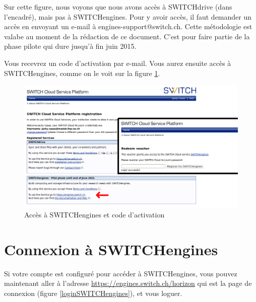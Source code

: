Sur cette figure, nous voyons que nous avons accès à SWITCHdrive (dans l'encadré), mais pas à SWITCHengines. Pour y avoir accès, il faut demander un accès en envoyant un e-mail à engines-support@switch.ch. Cette métodologie est valabe au moment de la rédaction de ce document. C'est pour faire partie de la phase pilote qui dure jusqu'à fin juin 2015.


Vous recevrez un code d'activation par e-mail. Vous aurez ensuite accès à SWITCHengines, comme on le voit sur la figure \ref{enginesRecap2}.

\begin{figure}[h]
  \centering
    \includegraphics[width=\linewidth]{img/switch6.png}
  \caption{Accès à SWITCHengines et code d'activation}
  \label{enginesRecap2}
\end{figure}

\clearpage


\section{Connexion à SWITCHengines}


Si votre compte est configuré pour accéder à SWITCHengines, vous pouvez maintenant aller à l'adresse \url{https://engines.switch.ch/horizon} qui est la page de connexion (figure \ref{loginSWITCHengines}), et vous loguer.

